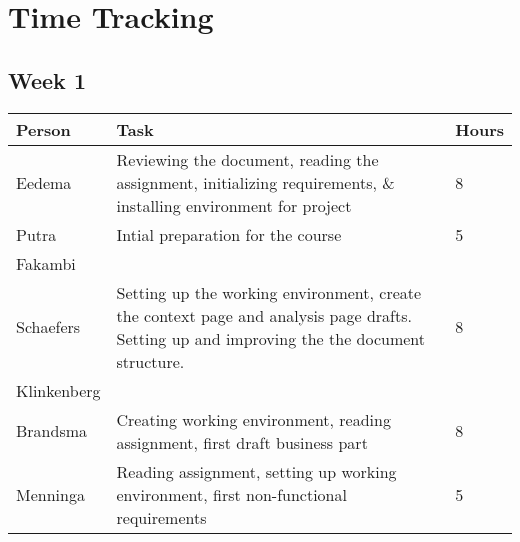 \chapter{Time Tracking}
\label{App: Time Tracking}


\section{Week 1}
\begin{tabular}{L{0.2\textwidth} L{0.7\textwidth} L{0.1\textwidth}}
    \textbf{Person} & \textbf{Task} & \textbf{Hours} \\ \toprule
	Eedema & Reviewing the document, reading the assignment, initializing requirements, \& installing environment for project & 8 \\ \midrule
	Putra & Intial preparation for the course & 5 \\ \midrule
	Fakambi & & \\ \midrule
	Schaefers & Setting up the working environment, create the context page and analysis page drafts. Setting up and improving the the document structure. & 8\\ \midrule
	Klinkenberg & & \\ \midrule
	Brandsma & Creating working environment, reading assignment, first draft business part & 8\\ \midrule
	Menninga & Reading assignment, setting up working environment, first non-functional requirements & 5 \\ \bottomrule
\end{tabular}

